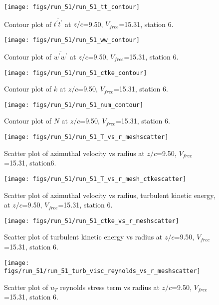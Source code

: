 \begin{figure}[H]
\centering
\texttt{[image: figs/run\_51/run\_51\_tt\_contour]}
\caption{Contour plot of $\overline{t^\prime t^\prime}$ at $z/c$=9.50, $V_{free}$=15.31, station 6.}
\end{figure}


\begin{figure}[H]
\centering
\texttt{[image: figs/run\_51/run\_51\_ww\_contour]}
\caption{Contour plot of $\overline{w^\prime w^\prime}$ at $z/c$=9.50, $V_{free}$=15.31, station 6.}
\end{figure}


\begin{figure}[H]
\centering
\texttt{[image: figs/run\_51/run\_51\_ctke\_contour]}
\caption{Contour plot of $k$ at $z/c$=9.50, $V_{free}$=15.31, station 6.}
\end{figure}


\begin{figure}[H]
\centering
\texttt{[image: figs/run\_51/run\_51\_num\_contour]}
\caption{Contour plot of $N$ at $z/c$=9.50, $V_{free}$=15.31, station 6.}
\end{figure}


\begin{figure}[H]
\centering
\texttt{[image: figs/run\_51/run\_51\_T\_vs\_r\_meshscatter]}
\caption{Scatter plot of azimuthal velocity vs radius at $z/c$=9.50, $V_{free}$=15.31, station6.}
\end{figure}


\begin{figure}[H]
\centering
\texttt{[image: figs/run\_51/run\_51\_T\_vs\_r\_mesh\_ctkescatter]}
\caption{Scatter plot of azimuthal velocity vs radius, turbulent kinetic energy, at $z/c$=9.50, $V_{free}$=15.31, station 6.}
\end{figure}


\begin{figure}[H]
\centering
\texttt{[image: figs/run\_51/run\_51\_ctke\_vs\_r\_meshscatter]}
\caption{Scatter plot of turbulent kinetic energy vs radius at $z/c$=9.50, $V_{free}$=15.31, station 6.}
\end{figure}


\begin{figure}[H]
\centering
\texttt{[image: figs/run\_51/run\_51\_turb\_visc\_reynolds\_vs\_r\_meshscatter]}
\caption{Scatter plot of $
u_T$ reynolds stress term vs radius at $z/c$=9.50, $V_{free}$=15.31, station 6.}
\end{figure}


